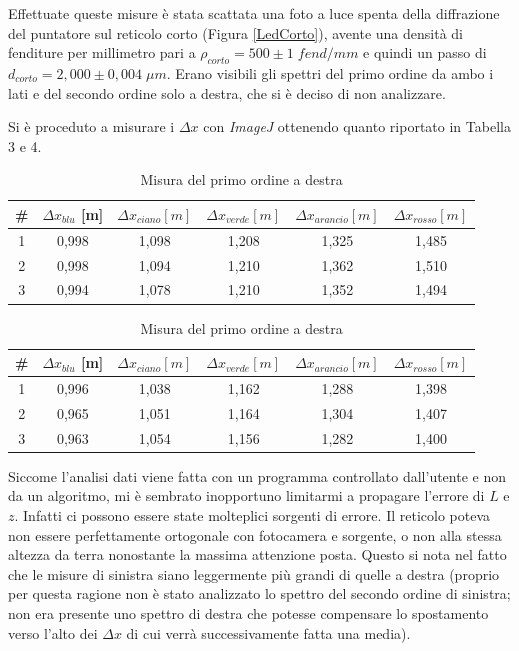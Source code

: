 \documentclass{article}
\begin{document}
\clearpage

Effettuate queste misure è stata scattata una foto a luce spenta della diffrazione del puntatore sul reticolo corto (Figura \ref{LedCorto}), avente una densità di fenditure per millimetro pari a $\rho_{corto} = 500 \pm 1\; fend/mm $ e quindi un passo di $d_{corto} = 2,000 \pm 0,004 \; \mu m $. Erano visibili  gli spettri del primo ordine da ambo i lati e del secondo ordine solo a destra, che si è deciso di non analizzare.

\vspace{3mm}

Si è proceduto a misurare i $ \Delta x $ con \textit{ImageJ} ottenendo quanto riportato in Tabella 3 e 4.

\begin{table}[h]
        \centering
        \begin{tabular}{||c|c|c|c|c|c||}
            \hline
            \# & \cellcolor{blue}$\Delta x_{blu}$ [m] & \cellcolor{cyan}$\Delta x_{ciano}[m]$ & \cellcolor{green}$\Delta x_{verde}[m]$ & \cellcolor{orange}$\Delta x_{arancio}[m]$ & \cellcolor{red}$\Delta x_{rosso}[m]$ \\
            \hline
            1 & 0,998 & 1,098 & 1,208 & 1,325 & 1,485 \\
            2 & 0,998 & 1,094 & 1,210 & 1,362 & 1,510 \\
            3 & 0,994 & 1,078 & 1,210 & 1,352 & 1,494 \\
            \hline
        \end{tabular}
        \caption{Misura del primo ordine a sinistra}
    \centering
    \begin{tabular}{||c|c|c|c|c|c||}
        \hline
        \# & \cellcolor{blue}$\Delta x_{blu}$ [m] & \cellcolor{cyan}$\Delta x_{ciano}[m]$ & \cellcolor{green}$\Delta x_{verde}[m]$ & \cellcolor{orange}$\Delta x_{arancio}[m]$ & \cellcolor{red}$\Delta x_{rosso}[m]$ \\
        \hline
        1 & 0,996 & 1,038 & 1,162 & 1,288 & 1,398 \\
        2 & 0,965 & 1,051 & 1,164 & 1,304 & 1,407\\
        3 & 0,963 & 1,054 & 1,156 & 1,282 & 1,400 \\
        \hline
    \end{tabular}
    \caption{Misura del primo ordine a destra}
\end{table}


Siccome l'analisi dati viene fatta con un programma controllato dall'utente e non da un algoritmo, mi è sembrato inopportuno limitarmi a propagare l'errore di $L$ e $z$. Infatti ci possono essere state molteplici sorgenti di errore. Il reticolo poteva non essere perfettamente ortogonale con fotocamera e sorgente, o non alla stessa altezza da terra nonostante la massima attenzione posta. Questo si nota nel fatto che le misure di sinistra siano leggermente più grandi di quelle a destra (proprio per questa ragione non è stato analizzato lo spettro del secondo ordine di sinistra; non era presente uno spettro di destra che potesse compensare lo spostamento verso l'alto dei $\Delta x$ di cui verrà successivamente fatta una media). 
\end{document}
